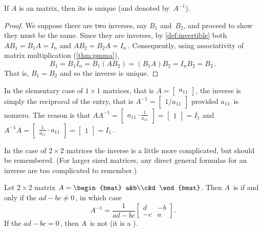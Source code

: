 \begin{theorem} \label{thm:uninv} 
If \(A\) is an  matrix, then its  is unique (and denoted by~\(A^{-1}\)).
\end{theorem}
\begin{proof} 
We suppose there are two inverses, say \(B_1\) and~\(B_2\), and proceed to show they must be the same.
Since they are inverses, by \cref{def:invertible} both
\(AB_1=B_1A=I_n\) and \(AB_2=B_2A=I_n\)\,.
Consequently, using associativity of matrix multiplication (\cref{thm:pmma}),
\begin{equation*}
B_1=B_1I_n=B_1(AB_2)=(B_1A)B_2=I_nB_2=B_2\,.
\end{equation*}
That is, \(B_1=B_2\) and so the inverse is unique.
\end{proof}



In the elementary case of \(1\times1\) matrices, that is \(A=\begin{bmatrix} a_{11} \end{bmatrix}\), the inverse is simply the reciprocal of the entry, that is \(A^{-1}=\begin{bmatrix} 1/a_{11} \end{bmatrix}\) provided \(a_{11}\)~is nonzero.
The reason is that \(AA^{-1}=\begin{bmatrix} a_{11}\cdot\frac1{a_{11}} \end{bmatrix}=\begin{bmatrix} 1 \end{bmatrix}=I_1\) and  \(A^{-1}A=\begin{bmatrix} \frac1{a_{11}}\cdot a_{11} \end{bmatrix}=\begin{bmatrix} 1 \end{bmatrix}=I_1\)\,.

In the case of \(2\times2\) matrices the inverse is a little more complicated, but should be remembered.
(For larger sized matrices, any direct general formulas for an inverse are too complicated to remember.)

\begin{theorem} \label{thm:2x2det} 
Let \(2\times2\) matrix \(A=\begin{bmat} a&b\\c&d \end{bmat}\). Then \(A\)~is  if and only if the  \(ad-bc\neq0\)\,, in which case
\begin{equation}
A^{-1}=\frac1{ad-bc}\begin{bmatrix} d&-b\\-c&a \end{bmatrix}.
\label{eq:2x2inv}
\end{equation}
If the  \(ad-bc=0\)\,, then \(A\)~is not  (it is a ).
\end{theorem}

